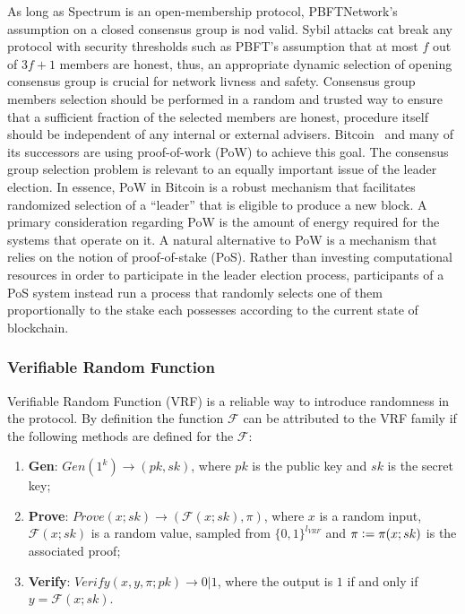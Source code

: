As long as Spectrum is an open-membership protocol, PBFTNetwork's assumption on a closed consensus group is nod valid.
Sybil attacks cat break any protocol with security thresholds such as PBFT's assumption that at most $f$ out of ${3 f + 1}$ members are honest, thus, an appropriate dynamic selection of opening consensus group is crucial for network livness and safety.
Consensus group members selection should be performed in a random and trusted way to ensure that a sufficient fraction of the selected members are honest, procedure itself should be independent of any internal or external advisers.
Bitcoin~\cite{nakamoto2009bitcoin} and many of its successors are using proof-of-work (PoW) to achieve this goal.
The consensus group selection problem is relevant to an equally important issue of the leader election.
In essence, PoW in Bitcoin is a robust mechanism that facilitates randomized selection of a \enquote{leader} that is eligible to produce a new block.
A primary consideration regarding PoW is the amount of energy required for the systems that operate on it.
A natural alternative to PoW is a mechanism that relies on the notion of proof-of-stake (PoS).
Rather than investing computational resources in order to participate in the leader election process, participants of a PoS system instead run a process that randomly selects one of them proportionally to the stake each possesses according to the current state of blockchain.

\subsubsection{Verifiable Random Function}

Verifiable Random Function (VRF) is a reliable way to introduce randomness in the protocol.
By definition the function $\mathcal{F}$ can be attributed to the VRF family if the following methods are defined for the $\mathcal{F}$:
\begin{enumerate}
    \item \textbf{Gen}: ${Gen(1^k) \rightarrow (pk, sk)}$, where $pk$ is the public key and $sk$ is the secret key;
    \item \textbf{Prove}: ${Prove(x; sk) \rightarrow (\mathcal{F}(x; sk), \pi)}$, where $x$ is a random input, $\mathcal{F}(x; sk)$ is a random value, sampled from $\{0,1\}^{l_{VRF}}$ and $\pi \vcentcolon= \pi(x; sk)$ is the associated proof;
    \item \textbf{Verify}: ${Verify(x, y, \pi; pk) \rightarrow 0 | 1}$, where the output is $1$ if and only if ${y=\mathcal{F}(x; sk)}$.
\end{enumerate}

